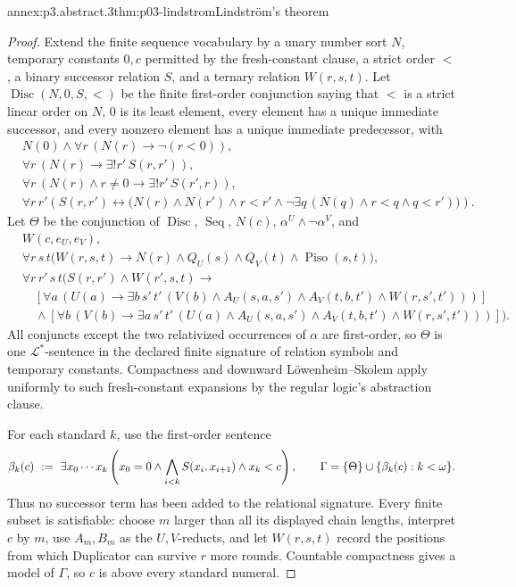 \begin{annexitem}{annex:p3.abstract.3}{thm:p03-lindstrom}{Lindstr\"om's theorem}
\begin{proof}
Extend the finite sequence vocabulary by a unary number sort \(N\), temporary
constants \(0,c\) permitted by the fresh-constant clause, a strict order
\(<\), a binary successor relation \(S\), and a ternary relation
\(W(r,s,t)\).  Let \(\operatorname{Disc}(N,0,S,<)\) be the finite
first-order conjunction saying that \(<\) is a strict linear order on \(N\),
\(0\) is its least element, every element has a unique immediate successor,
and every nonzero element has a unique immediate predecessor, with
\[
\begin{aligned}
 &N(0)\land\forall r\,(N(r)\to\neg(r<0)),\\
 &\forall r\,(N(r)\to\exists!r'\,S(r,r')),\\
 &\forall r\,(N(r)\land r\ne0\to\exists!r'\,S(r',r)),\\
 &\forall r\,r'\left(S(r,r')\leftrightarrow
   \bigl(N(r)\land N(r')\land r<r'
     \land\neg\exists q\,(N(q)\land r<q\land q<r')\bigr)\right).
\end{aligned}
\]
Let \(\Theta\) be the conjunction of \(\operatorname{Disc}\),
\(\operatorname{Seq}\), \(N(c)\),
\(\alpha^U\land\neg\alpha^V\), and
\[
\begin{aligned}
 &W(c,e_U,e_V),\\
 &\forall r\,s\,t\bigl(W(r,s,t)\to
      N(r)\land Q_U(s)\land Q_V(t)\land\operatorname{Piso}(s,t)\bigr),\\
 &\forall r\,r'\,s\,t\bigl(S(r,r')\land W(r',s,t)\to{}\\
 &\quad [\forall a\,(U(a)\to\exists b\,s'\,t'\,
      (V(b)\land A_U(s,a,s')\land A_V(t,b,t')\land W(r,s',t')))]\\
 &\quad\land[\forall b\,(V(b)\to\exists a\,s'\,t'\,
      (U(a)\land A_U(s,a,s')\land A_V(t,b,t')\land W(r,s',t')))]\bigr).
\end{aligned}
\]
All conjuncts except the two relativized occurrences of \(\alpha\) are
first-order, so \(\Theta\) is one \(\mathcal L^*\)-sentence in the declared
finite signature of relation symbols and temporary constants.  Compactness
and downward L\"owenheim--Skolem apply uniformly to such fresh-constant
expansions by the regular logic's abstraction clause.

For each standard \(k\), use the first-order sentence
\[
 \beta_k(c)\ \defeq\
 \exists x_0\cdots x_k\left(
   x_0=0\land\bigwedge_{i<k}S(x_i,x_{i+1})\land x_k<c\right),
 \qquad
 \Gamma=\{\Theta\}\cup\{\beta_k(c):k<\omega\}.
\]
Thus no successor term has been added to the relational signature.  Every
finite subset is satisfiable: choose \(m\) larger than all its displayed chain
lengths,
interpret \(c\) by \(m\), use \(A_m,B_m\) as the \(U,V\)-reducts, and let
\(W(r,s,t)\) record the positions from which Duplicator can survive \(r\)
more rounds.  Countable compactness gives a model of \(\Gamma\), so \(c\) is
above every standard numeral.


\end{proof}
\end{annexitem}
